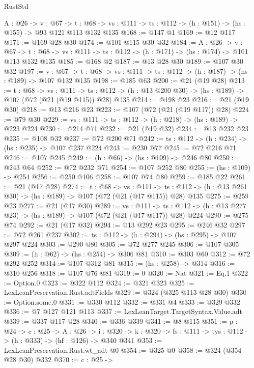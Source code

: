 \begin{lexlean}{RustStd}
\begin{coremodule}
  {A : @26} ->
  {v : @67} ->
  {t : @68} -> {vs : @111} -> {ts : @112} -> (h : @151) -> (hs : @155) -> @93 @121 @113 @132 @135
@168 := @147 @1
@169 := @12 @117
@171 := @169 @28 @30
@174 := @101 @115 @30 @32
@184 := {A : @26} ->
  {v : @67} ->
  {t : @68} -> {vs : @111} -> {ts : @112} -> (h : @171) -> (hs : @174) -> @101 @113 @132 @135
@185 := @168 @2
@187 := @13 @28 @30
@189 := @107 @30 @32
@197 := {v : @67} ->
  {t : @68} -> {vs : @111} -> {ts : @112} -> (h : @187) -> (hs : @189) -> @107 @132 @135
@198 := @185 @63
@200 := @21 (@19 @28)
@213 := {t : @68} ->
  {vs : @111} ->
  {ts : @112} -> (h : @13 @200 @30) -> (hs : @189) -> @107 (@72 (@21 (@19 @115)) @28) @135
@214 := @198 @23
@216 := @21 (@19 @30)
@218 := @13 @216 @23
@223 := @107 (@72 (@21 (@19 @117)) @28)
@224 := @79 @30
@229 := {vs : @111} -> {ts : @112} -> (h : @218) -> (hs : @189) -> @223 @224
@230 := @214 @71
@232 := @21 (@19 @32)
@234 := @13 @232 @23
@235 := @108 @32
@237 := @72 @200 @71
@242 := {ts : @112} -> (h : @234) -> (hs : @235) -> @107 @237 @224
@243 := @230 @77
@245 := @72 @216 @71
@246 := @107 @245
@249 := (h : @66) -> (hs : @109) -> @246 @80
@250 := @243 @64
@252 := @72 @232 @71
@254 := @107 @252 @80
@255 := (hs : @109) -> @254
@256 := @250 @106
@258 := @107 @74 @80
@259 := @185 @22
@261 := @21 (@17 @28)
@274 := {t : @68} ->
  {vs : @111} ->
  {ts : @112} -> (h : @13 @261 @30) -> (hs : @189) -> @107 (@72 (@21 (@17 @115)) @28) @135
@275 := @259 @23
@277 := @21 (@17 @30)
@289 := {vs : @111} ->
  {ts : @112} -> (h : @13 @277 @23) -> (hs : @189) -> @107 (@72 (@21 (@17 @117)) @28) @224
@290 := @275 @74
@292 := @21 (@17 @32)
@294 := @13 @292 @23
@295 := @246 @32
@297 := @72 @261 @237
@302 := {ts : @112} -> (h : @294) -> (hs : @295) -> @107 @297 @224
@303 := @290 @80
@305 := @72 @277 @245
@306 := @107 @305
@309 := (h : @62) -> (hs : @254) -> @306 @81
@310 := @303 @60
@312 := @72 @292 @252
@314 := @107 @312 @81
@315 := (hs : @258) -> @314
@316 := @310 @256
@318 := @107 @76 @81
@319 := 0
@320 := Nat
@321 := Eq.{1}
@322 := Option.{0}
@323 := @322 @112
@324 := @321 @323
@325 := LexLeanPreservation.Rust.adtFields
@329 := @324 (@325 @113 @28 @30)
@330 := Option.some.{0}
@331 := @330 @112
@332 := @331 @4
@333 := @329 @332
@336 := @7 @127 @121 @113
@337 := LexLeanTarget.TargetSyntax.Value.adt
@339 := @337 @117 @28
@340 := @336 @339
@341 := @8 @115
@351 := {p : @24} ->
  {c : @25} ->
  {A : @26} ->
  {i : @320} -> {k : @320} -> {fs : @111} -> {tys : @112} -> (h : @333) -> (hf : @126) -> @340 @341
@353 := LexLeanPreservation.Rust.wt_adt @0
@354 := @325 @0
@358 := @324 (@354 @28 @30) @332
@370 := {c : @25} ->

\end{coremodule}
\end{lexlean}
